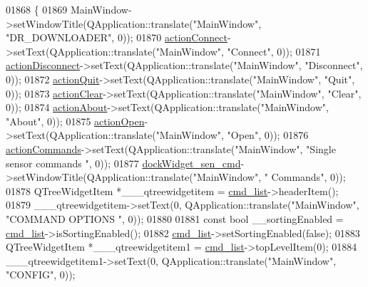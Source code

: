 \begin{DoxyCode}
01868     \{
01869         MainWindow->setWindowTitle(QApplication::translate(\textcolor{stringliteral}{"MainWindow"}, \textcolor{stringliteral}{"DR\_DOWNLOADER"}, 0));
01870         \hyperlink{a00080_aa0785566311fc48271690fb68b1d4c5f}{actionConnect}->setText(QApplication::translate(\textcolor{stringliteral}{"MainWindow"}, \textcolor{stringliteral}{"Connect"}, 0));
01871         \hyperlink{a00080_a8a16b3aef75b279eaaa887152d2f746b}{actionDisconnect}->setText(QApplication::translate(\textcolor{stringliteral}{"MainWindow"}, \textcolor{stringliteral}{"Disconnect"}, 0));
01872         \hyperlink{a00080_a188c243f36a2dbc10e4e2a0ad94273b1}{actionQuit}->setText(QApplication::translate(\textcolor{stringliteral}{"MainWindow"}, \textcolor{stringliteral}{"Quit"}, 0));
01873         \hyperlink{a00080_ac8539dcd87955047877cb256aff60453}{actionClear}->setText(QApplication::translate(\textcolor{stringliteral}{"MainWindow"}, \textcolor{stringliteral}{"Clear"}, 0));
01874         \hyperlink{a00080_abdf2b43167c2cd0d3405f90b8c30e934}{actionAbout}->setText(QApplication::translate(\textcolor{stringliteral}{"MainWindow"}, \textcolor{stringliteral}{"About"}, 0));
01875         \hyperlink{a00080_a5772f39001f62b7f601aafe72caa10c0}{actionOpen}->setText(QApplication::translate(\textcolor{stringliteral}{"MainWindow"}, \textcolor{stringliteral}{"Open"}, 0));
01876         \hyperlink{a00080_a3dccdc21d3df68b86550093b5e3c0356}{actionCommands}->setText(QApplication::translate(\textcolor{stringliteral}{"MainWindow"}, \textcolor{stringliteral}{"Single sensor commands
       "}, 0));
01877         \hyperlink{a00080_a9eb86a5ee396766f0f4a65f2d2bd7688}{dockWidget\_sen\_cmd}->setWindowTitle(QApplication::translate(\textcolor{stringliteral}{"MainWindow"}, \textcolor{stringliteral}{"
      Commands"}, 0));
01878         QTreeWidgetItem *\_\_\_qtreewidgetitem = \hyperlink{a00080_aa66ece71395b435e915d384fb63bac1d}{cmd\_list}->headerItem();
01879         \_\_\_qtreewidgetitem->setText(0, QApplication::translate(\textcolor{stringliteral}{"MainWindow"}, \textcolor{stringliteral}{"COMMAND OPTIONS  "}, 0));
01880 
01881         \textcolor{keyword}{const} \textcolor{keywordtype}{bool} \_\_sortingEnabled = \hyperlink{a00080_aa66ece71395b435e915d384fb63bac1d}{cmd\_list}->isSortingEnabled();
01882         \hyperlink{a00080_aa66ece71395b435e915d384fb63bac1d}{cmd\_list}->setSortingEnabled(\textcolor{keyword}{false});
01883         QTreeWidgetItem *\_\_\_qtreewidgetitem1 = \hyperlink{a00080_aa66ece71395b435e915d384fb63bac1d}{cmd\_list}->topLevelItem(0);
01884         \_\_\_qtreewidgetitem1->setText(0, QApplication::translate(\textcolor{stringliteral}{"MainWindow"}, \textcolor{stringliteral}{"CONFIG"}, 0));

\end{DoxyCode}
